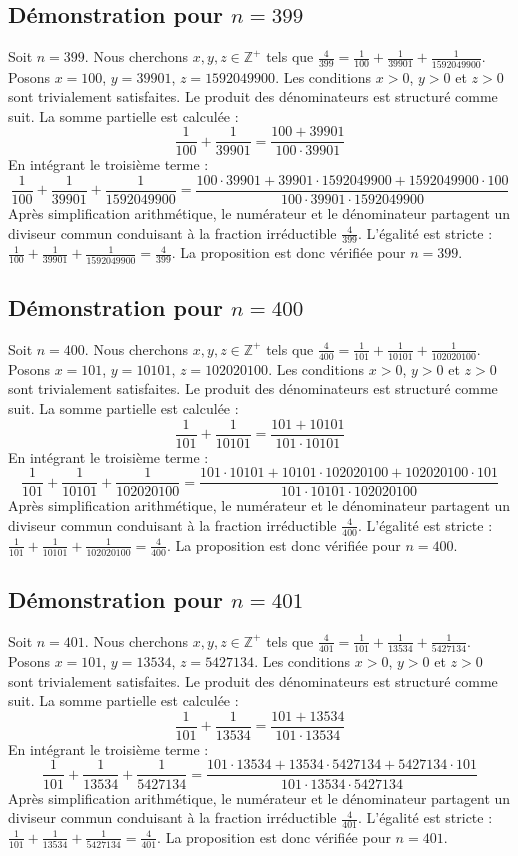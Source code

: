 \documentclass[11pt,a4paper]{article}
\begin{document}
\subsection{Démonstration pour $n = 399$}
Soit $n = 399$. Nous cherchons $x, y, z \in \mathbb{Z}^{+}$ tels que $\frac{4}{399} = \frac{1}{100} + \frac{1}{39901} + \frac{1}{1592049900}$.
Posons $x = 100$, $y = 39901$, $z = 1592049900$.
Les conditions $x > 0$, $y > 0$ et $z > 0$ sont trivialement satisfaites.
Le produit des dénominateurs est structuré comme suit. La somme partielle est calculée :
$$ \frac{1}{100} + \frac{1}{39901} = \frac{100+39901}{100 \cdot 39901} $$
En intégrant le troisième terme :
$$ \frac{1}{100} + \frac{1}{39901} + \frac{1}{1592049900} = \frac{100 \cdot 39901 + 39901 \cdot 1592049900 + 1592049900 \cdot 100}{100 \cdot 39901 \cdot 1592049900} $$
Après simplification arithmétique, le numérateur et le dénominateur partagent un diviseur commun conduisant à la fraction irréductible $\frac{4}{399}$.
L'égalité est stricte : $\frac{1}{100} + \frac{1}{39901} + \frac{1}{1592049900} = \frac{4}{399}$.
La proposition est donc vérifiée pour $n = 399$.
\subsection{Démonstration pour $n = 400$}
Soit $n = 400$. Nous cherchons $x, y, z \in \mathbb{Z}^{+}$ tels que $\frac{4}{400} = \frac{1}{101} + \frac{1}{10101} + \frac{1}{102020100}$.
Posons $x = 101$, $y = 10101$, $z = 102020100$.
Les conditions $x > 0$, $y > 0$ et $z > 0$ sont trivialement satisfaites.
Le produit des dénominateurs est structuré comme suit. La somme partielle est calculée :
$$ \frac{1}{101} + \frac{1}{10101} = \frac{101+10101}{101 \cdot 10101} $$
En intégrant le troisième terme :
$$ \frac{1}{101} + \frac{1}{10101} + \frac{1}{102020100} = \frac{101 \cdot 10101 + 10101 \cdot 102020100 + 102020100 \cdot 101}{101 \cdot 10101 \cdot 102020100} $$
Après simplification arithmétique, le numérateur et le dénominateur partagent un diviseur commun conduisant à la fraction irréductible $\frac{4}{400}$.
L'égalité est stricte : $\frac{1}{101} + \frac{1}{10101} + \frac{1}{102020100} = \frac{4}{400}$.
La proposition est donc vérifiée pour $n = 400$.
\subsection{Démonstration pour $n = 401$}
Soit $n = 401$. Nous cherchons $x, y, z \in \mathbb{Z}^{+}$ tels que $\frac{4}{401} = \frac{1}{101} + \frac{1}{13534} + \frac{1}{5427134}$.
Posons $x = 101$, $y = 13534$, $z = 5427134$.
Les conditions $x > 0$, $y > 0$ et $z > 0$ sont trivialement satisfaites.
Le produit des dénominateurs est structuré comme suit. La somme partielle est calculée :
$$ \frac{1}{101} + \frac{1}{13534} = \frac{101+13534}{101 \cdot 13534} $$
En intégrant le troisième terme :
$$ \frac{1}{101} + \frac{1}{13534} + \frac{1}{5427134} = \frac{101 \cdot 13534 + 13534 \cdot 5427134 + 5427134 \cdot 101}{101 \cdot 13534 \cdot 5427134} $$
Après simplification arithmétique, le numérateur et le dénominateur partagent un diviseur commun conduisant à la fraction irréductible $\frac{4}{401}$.
L'égalité est stricte : $\frac{1}{101} + \frac{1}{13534} + \frac{1}{5427134} = \frac{4}{401}$.
La proposition est donc vérifiée pour $n = 401$.
\end{document}
